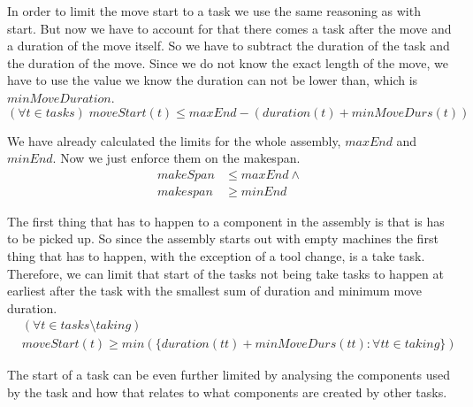 \newpage

  \noindent In order to limit the move start to a task we use the same reasoning as with start. But now we have to account for that there comes a task after the move and a duration of the move itself. So we have to subtract the duration of the task and the duration of the move. Since we do not know the exact length of the move, we have to use the value we know the duration can not be lower than, which is $minMoveDuration$.
  \begin{equation}\label{eq:63}
  (\forall t \in tasks) \; moveStart(t) \le maxEnd-(duration(t)+minMoveDurs(t))
  \end{equation}

  \noindent  We have already calculated the limits for the whole assembly, $maxEnd$ and $minEnd$. Now we just enforce them on the makespan.
  \begin{equation}\label{eq:66}
  \begin{aligned}
  makeSpan &\le maxEnd \land\\
  makespan &\ge minEnd
  \end{aligned}
  \end{equation}

   \noindent The first thing that has to happen to a component in the assembly is that is has to be picked up. So since the assembly starts out with empty machines the first thing that has to happen, with the exception of a tool change, is a take task. Therefore, we can limit that start of the tasks not being take tasks to happen at earliest after the task with the smallest sum of duration and minimum move duration.
  \begin{equation}
  \begin{aligned}\label{eq:69}
  &(\forall t \in tasks \setminus taking) \\
  &moveStart(t) \ge min(\{duration(tt) + minMoveDurs(tt) : \forall tt \in taking\})
  \end{aligned}
  \end{equation}

  \noindent  The start of a task can be even further limited by analysing the components used by the task and how that relates to what components are created by other tasks.
    
